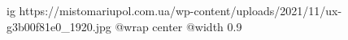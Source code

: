  
 
 
 
 

\ifcmt
  ig https://mistomariupol.com.ua/wp-content/uploads/2021/11/ux-g3b00f81e0_1920.jpg
  @wrap center
  @width 0.9
\fi
